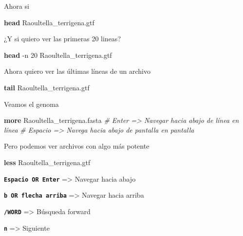 \documentclass[
]{book}
\newenvironment{Shaded}{\begin{snugshade}}{\end{snugshade}}
\newcommand{\AttributeTok}[1]{\textcolor[rgb]{0.13,0.29,0.53}{#1}}
\newcommand{\CommentTok}[1]{\textcolor[rgb]{0.56,0.35,0.01}{\textit{#1}}}
\newcommand{\FunctionTok}[1]{\textcolor[rgb]{0.13,0.29,0.53}{\textbf{#1}}}
\newcommand{\NormalTok}[1]{#1}
\begin{document}
Ahora si

\begin{Shaded}
\begin{Highlighting}[]
\FunctionTok{head}\NormalTok{ Raoultella\_terrigena.gtf}
\end{Highlighting}
\end{Shaded}

¿Y si quiero ver las primeras 20 lineas?

\begin{Shaded}
\begin{Highlighting}[]
\FunctionTok{head} \AttributeTok{{-}n}\NormalTok{ 20 Raoultella\_terrigena.gtf}
\end{Highlighting}
\end{Shaded}

Ahora quiero ver las últimas líneas de un archivo

\begin{Shaded}
\begin{Highlighting}[]
\FunctionTok{tail}\NormalTok{ Raoultella\_terrigena.gtf}
\end{Highlighting}
\end{Shaded}

Veamos el genoma

\begin{Shaded}
\begin{Highlighting}[]
\FunctionTok{more}\NormalTok{ Raoultella\_terrigena.fasta}
\CommentTok{\# Enter =\textgreater{} Navegar hacia abajo de línea en línea}
\CommentTok{\# Espacio =\textgreater{} Navega hacia abajo de pantalla en pantalla}
\end{Highlighting}
\end{Shaded}

Pero podemos ver archivos con algo más potente

\begin{Shaded}
\begin{Highlighting}[]
\FunctionTok{less}\NormalTok{ Raoultella\_terrigena.gtf}
\end{Highlighting}
\end{Shaded}

\textbf{\texttt{Espacio\ OR\ Enter}} =\textgreater{} Navegar hacia abajo

\textbf{\texttt{b\ OR\ flecha\ arriba}} =\textgreater{} Navegar hacia arriba

\textbf{\texttt{/WORD}} =\textgreater{} Búsqueda forward

\textbf{\texttt{n}} =\textgreater{} Siguiente
\end{document}
